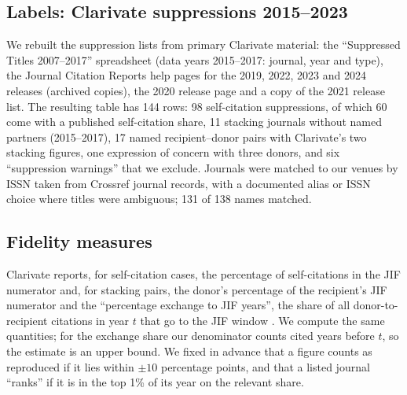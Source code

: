 \subsection{Labels: Clarivate suppressions 2015--2023}
We rebuilt the suppression lists from primary Clarivate material: the ``Suppressed Titles 2007--2017'' spreadsheet
(data years 2015--2017: journal, year and type), the Journal Citation Reports help pages for the 2019, 2022, 2023 and
2024 releases (archived copies), the 2020 release page and a copy of the 2021 release list. The resulting table has 144
rows: 98 self-citation suppressions, of which 60 come with a published self-citation share, 11 stacking journals
without named partners (2015--2017), 17 named recipient--donor pairs with Clarivate's two stacking figures, one
expression of concern with three donors, and six ``suppression warnings'' that we exclude. Journals were matched to
our venues by ISSN taken from Crossref journal records, with a documented alias or ISSN choice where titles were
ambiguous; 131 of 138 names matched.

\subsection{Fidelity measures}
Clarivate reports, for self-citation cases, the percentage of self-citations in the JIF numerator and, for stacking
pairs, the donor's percentage of the recipient's JIF numerator and the ``percentage exchange to JIF years'', the share
of all donor-to-recipient citations in year $t$ that go to the JIF window . We
compute the same quantities; for the exchange share our denominator counts cited years before $t$, so the estimate is
an upper bound. We fixed in advance that a figure counts as reproduced if it lies within $\pm10$ percentage points,
and that a listed journal ``ranks'' if it is in the top 1\% of its year on the relevant share.

